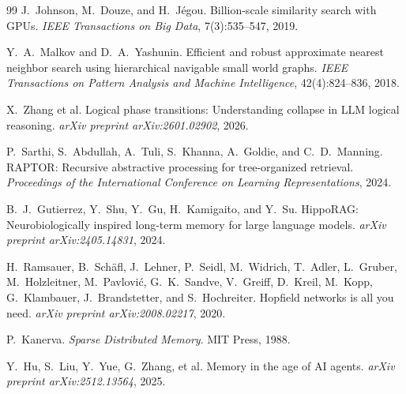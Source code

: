 \documentclass[11pt]{article}
\begin{document}
\begin{thebibliography}{99}
J.~Johnson, M.~Douze, and H.~J{\'e}gou.
Billion-scale similarity search with GPUs.
\textit{IEEE Transactions on Big Data}, 7(3):535--547, 2019.

Y.~A.~Malkov and D.~A.~Yashunin.
Efficient and robust approximate nearest neighbor search using hierarchical navigable small world graphs.
\textit{IEEE Transactions on Pattern Analysis and Machine Intelligence}, 42(4):824--836, 2018.

X.~Zhang et al.
Logical phase transitions: Understanding collapse in LLM logical reasoning.
\textit{arXiv preprint arXiv:2601.02902}, 2026.

P.~Sarthi, S.~Abdullah, A.~Tuli, S.~Khanna, A.~Goldie, and C.~D.~Manning.
RAPTOR: Recursive abstractive processing for tree-organized retrieval.
\textit{Proceedings of the International Conference on Learning Representations}, 2024.

B.~J.~Gutierrez, Y.~Shu, Y.~Gu, H.~Kamigaito, and Y.~Su.
HippoRAG: Neurobiologically inspired long-term memory for large language models.
\textit{arXiv preprint arXiv:2405.14831}, 2024.

H.~Ramsauer, B.~Sch{\"a}fl, J.~Lehner, P.~Seidl, M.~Widrich, T.~Adler, L.~Gruber, M.~Holzleitner, M.~Pavlovi{\'c}, G.~K.~Sandve, V.~Greiff, D.~Kreil, M.~Kopp, G.~Klambauer, J.~Brandstetter, and S.~Hochreiter.
Hopfield networks is all you need.
\textit{arXiv preprint arXiv:2008.02217}, 2020.

P.~Kanerva.
\textit{Sparse Distributed Memory}.
MIT Press, 1988.

Y.~Hu, S.~Liu, Y.~Yue, G.~Zhang, et al.
Memory in the age of AI agents.
\textit{arXiv preprint arXiv:2512.13564}, 2025.

\end{thebibliography}
\end{document}
